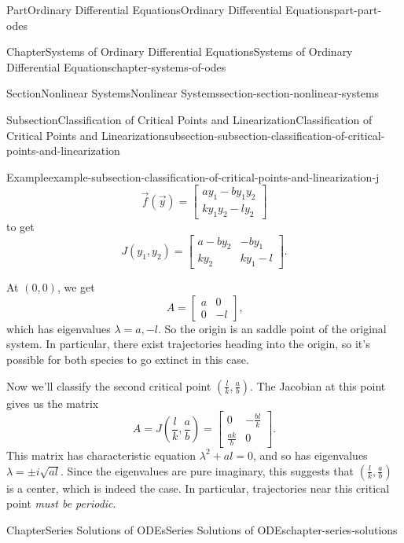 \documentclass[twoside,10pt,]{book}
\numberwithin{equation}{part}
\begin{document}
\begin{partptx}{Part}{Ordinary Differential Equations}{}{Ordinary Differential Equations}{}{}{part-part-odes}
\begin{chapterptx}{Chapter}{Systems of Ordinary Differential Equations}{}{Systems of Ordinary Differential Equations}{}{}{chapter-systems-of-odes}
\begin{sectionptx}{Section}{Nonlinear Systems}{}{Nonlinear Systems}{}{}{section-section-nonlinear-systems}
\begin{subsectionptx}{Subsection}{Classification of Critical Points and Linearization}{}{Classification of Critical Points and Linearization}{}{}{subsection-subsection-classification-of-critical-points-and-linearization}
\begin{example}{Example}{}{example-subsection-classification-of-critical-points-and-linearization-j}
\begin{equation*}
\vec{f}(\vec{y}) = \begin{bmatrix}ay_{1}-by_{1}y_{2} \\ ky_{1}y_{2} - ly_{2}\end{bmatrix}
\end{equation*}
to get%
\begin{equation*}
J(y_{1},y_{2}) = \begin{bmatrix}a-by_{2} &  -by_{1} \\ ky_{2} &  ky_{1} - l\end{bmatrix}.
\end{equation*}
%
\par
At \((0,0)\), we get%
\begin{equation*}
A = \begin{bmatrix}a &  0 \\ 0 &  -l\end{bmatrix}\text{,}
\end{equation*}
which has eigenvalues \(\lambda=a,-l\). So the origin is an saddle point of the original system. In particular, there exist trajectories heading into the origin, so it's possible for both species to go extinct in this case.%
\par
Now we'll classify the second critical point \((\frac{l}{k},\frac{a}{b})\). The Jacobian at this point gives us the matrix%
\begin{equation*}
A = J(\frac{l}{k},\frac{a}{b}) = \begin{bmatrix}0 &  -\frac{bl}{k} \\ \frac{ak}{b} &  0\end{bmatrix}\text{.}
\end{equation*}
This matrix has characteristic equation \(\lambda^{2} + al = 0\), and so has eigenvalues \(\lambda=\pm i\sqrt{al}\). Since the eigenvalues are pure imaginary, this suggests that \((\frac{l}{k},\frac{a}{b})\) is a center, which is indeed the case. In particular, trajectories near this critical point \emph{must be periodic}.%
\end{example}
\end{subsectionptx}
\end{sectionptx}
\end{chapterptx}
%
\typeout{************************************************}
\typeout{************************************************}
%
\begin{chapterptx}{Chapter}{Series Solutions of ODEs}{}{Series Solutions of ODEs}{}{}{chapter-series-solutions}
\renewcommand*{\chaptername}{Chapter}

\end{chapterptx}
\end{partptx}
\end{document}
